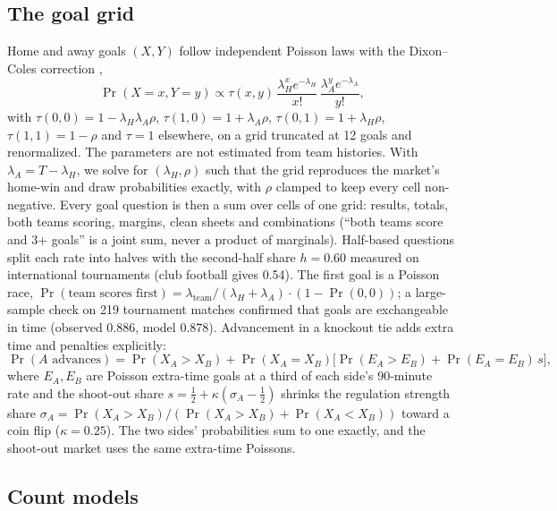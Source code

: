 \documentclass[11pt]{article}
\begin{document}
\subsection{The goal grid}\label{sec:grid}

Home and away goals $(X,Y)$ follow independent Poisson laws with the Dixon--Coles correction
\citep{dixon1997},
\begin{equation}\label{eq:dc}
  \Pr(X=x,Y=y)\propto\tau(x,y)\,\frac{\lambda_H^{x}e^{-\lambda_H}}{x!}\,
  \frac{\lambda_A^{y}e^{-\lambda_A}}{y!},
\end{equation}
with $\tau(0,0)=1-\lambda_H\lambda_A\rho$, $\tau(1,0)=1+\lambda_A\rho$,
$\tau(0,1)=1+\lambda_H\rho$, $\tau(1,1)=1-\rho$ and $\tau=1$ elsewhere, on a grid truncated at
12 goals and renormalized. The parameters are not estimated from team histories. With
$\lambda_A=T-\lambda_H$, we solve for $(\lambda_H,\rho)$ such that the grid reproduces the
market's home-win and draw probabilities exactly, with $\rho$ clamped to keep every cell
non-negative. Every goal question is then a sum over cells of one grid: results, totals, both
teams scoring, margins, clean sheets and combinations (``both teams score and 3+ goals'' is a
joint sum, never a product of marginals). Half-based questions split each rate into halves with
the second-half share $h=0.60$ measured on international tournaments (club football gives
0.54). The first goal is a Poisson race, $\Pr(\text{team scores first})=
\lambda_{\text{team}}/(\lambda_H+\lambda_A)\cdot(1-\Pr(0,0))$; a large-sample check on 219
tournament matches confirmed that goals are exchangeable in time (observed 0.886, model 0.878).
Advancement in a knockout tie adds extra time and penalties explicitly:
\begin{equation}\label{eq:advance}
  \Pr(A\text{ advances})=\Pr(X_A>X_B)+\Pr(X_A=X_B)\bigl[\Pr(E_A>E_B)+\Pr(E_A=E_B)\,s\bigr],
\end{equation}
where $E_A,E_B$ are Poisson extra-time goals at a third of each side's 90-minute rate and the
shoot-out share $s=\tfrac12+\kappa(\sigma_A-\tfrac12)$ shrinks the regulation strength share
$\sigma_A=\Pr(X_A>X_B)/(\Pr(X_A>X_B)+\Pr(X_A<X_B))$ toward a coin flip ($\kappa=0.25$). The two
sides' probabilities sum to one exactly, and the shoot-out market uses the same extra-time
Poissons.

\subsection{Count models}\label{sec:counts}
\end{document}
